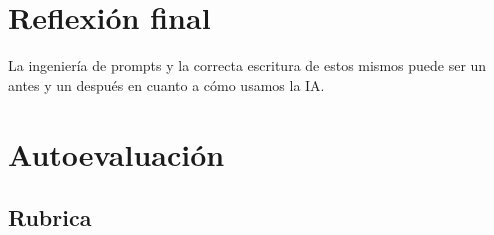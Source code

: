 \documentclass[12pt,a4paper]{article}
\begin{document}
\FloatBarrier

\section{Reflexión final}

La ingeniería de prompts y la correcta escritura de estos mismos puede ser un
antes y un después en cuanto a cómo usamos la IA.

\newpage

\section{Autoevaluación}
\subsection{Rubrica}
\end{document}
